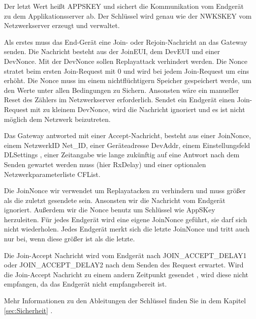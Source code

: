 \documentclass[a4paper, 12pt]{article}
\begin{document}
                Der letzt Wert heißt APPSKEY und sichert die Kommunikation vom Endgerät zu dem Applikationsserver ab. 
                Der Schlüssel wird genau wie der NWKSKEY vom Netzwerkserver erzeugt und verwaltet.\cite[S.3]{LoRaSecur}

                Als erstes muss das End-Gerät eine Join- oder Rejoin-Nachricht an das Gateway senden. Die Nachricht besteht aus der 
                JoinEUI, dem DevEUI und einer DevNonce. Mit der DevNonce sollen Replayattack verhindert werden. Die
                Nonce stratet beim ersten Join-Request mit 0 und wird bei jedem Join-Request um eins erhöht. 
                Die Nonce muss im einem nichtflüchtigern Speicher gespeichert werde, um den Werte unter allen Bedingungen 
                zu Sichern. Ansonsten wäre ein manueller Reset des Zählers im Netzwerkserver erforderlich.
                Sendet ein Endgerät einen Join-Request mit zu kleinem DevNonce, wird die Nachricht ignoriert und es 
                ist nicht möglich dem Netzwerk 
                beizutreten.

                Das Gateway antworted mit einer Accept-Nachricht, besteht aus einer JoinNonce, einem NetzwerkID Net\_ID, einer Geräteadresse DevAddr,
                einem Einstellungsfeld DLSettings , einer Zeitangabe wie lange zukünftig auf eine Antwort nach dem
                Senden gewartet werden muss (hier RxDelay) und einer optionalen Netzwerkparameterliste CFList.

                Die JoinNonce wir verwendet um Replayatacken zu verhindern und muss größer als die zuletzt 
                gesendete sein. Ansonsten wir die Nachricht vom Endgerät ignoriert. Außerdem wir die Nonce benutz 
                um Schlüssel wie 
                AppSKey herzuleiten. Für jedes Endgerät wird eine eigene JoinNonce geführt, sie darf sich nicht 
                wiederholen. Jedes Endgerät merkt sich die letzte JoinNonce und tritt auch nur bei, wenn diese größer 
                ist als die letzte.

                Die Join-Accept Nachricht wird vom Endgerät nach JOIN\_ACCEPT\_DELAY1 oder JOIN\_ACCEPT\_DELAY2 nach 
                dem Senden des Request erwartet. Wird die Join-Accept Nachricht zu einem andern Zeitpunkt gesendet 
                , wird diese nicht empfangen, da das Endgerät nicht empfangsbereit ist.

                Mehr Informationen zu den Ableitungen der Schlüssel finden Sie in dem Kapitel \ref{sec:Sicherheit} .
\end{document}

